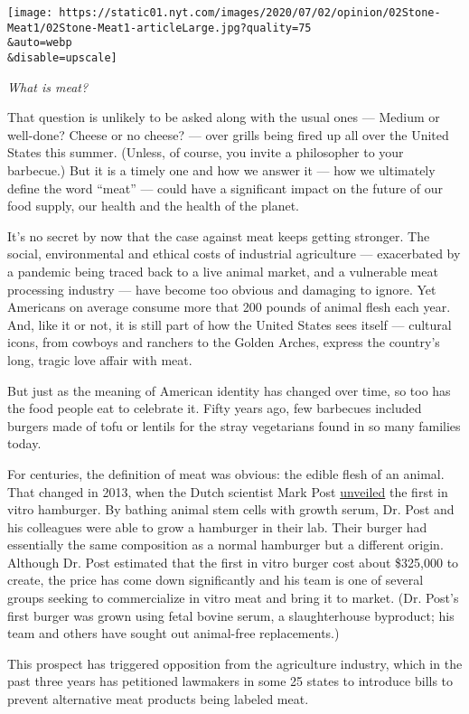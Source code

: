 \texttt{[image: https://static01.nyt.com/images/2020/07/02/opinion/02Stone-Meat1/02Stone-Meat1-articleLarge.jpg?quality=75\\\&auto=webp\\\&disable=upscale]}

\emph{What is meat?}

That question is unlikely to be asked along with the usual ones ---
Medium or well-done? Cheese or no cheese? --- over grills being fired up
all over the United States this summer. (Unless, of course, you invite a
philosopher to your barbecue.) But it is a timely one and how we answer
it --- how we ultimately define the word ``meat'' --- could have a
significant impact on the future of our food supply, our health and the
health of the planet.

It's no secret by now that the case against meat keeps getting stronger.
The social, environmental and ethical costs of industrial agriculture
--- exacerbated by a pandemic being traced back to a live animal market,
and a vulnerable meat processing industry --- have become too obvious
and damaging to ignore. Yet Americans on average consume more that 200
pounds of animal flesh each year. And, like it or not, it is still part
of how the United States sees itself --- cultural icons, from cowboys
and ranchers to the Golden Arches, express the country's long, tragic
love affair with meat.

But just as the meaning of American identity has changed over time, so
too has the food people eat to celebrate it. Fifty years ago, few
barbecues included burgers made of tofu or lentils for the stray
vegetarians found in so many families today.

For centuries, the definition of meat was obvious: the edible flesh of
an animal. That changed in 2013, when the Dutch scientist Mark Post
\href{https://www.nytimes.com/2013/05/14/science/engineering-the-325000-in-vitro-burger.html}{unveiled}
the first in vitro hamburger. By bathing animal stem cells with growth
serum, Dr. Post and his colleagues were able to grow a hamburger in
their lab. Their burger had essentially the same composition as a normal
hamburger but a different origin. Although Dr. Post estimated that the
first in vitro burger cost about \$325,000 to create, the price has come
down significantly and his team is one of several groups seeking to
commercialize in vitro meat and bring it to market. (Dr. Post's first
burger was grown using fetal bovine serum, a slaughterhouse byproduct;
his team and others have sought out animal-free replacements.)

This prospect has triggered opposition from the agriculture industry,
which in the past three years has petitioned lawmakers in some 25 states
to introduce bills to prevent alternative meat products being labeled
meat.

